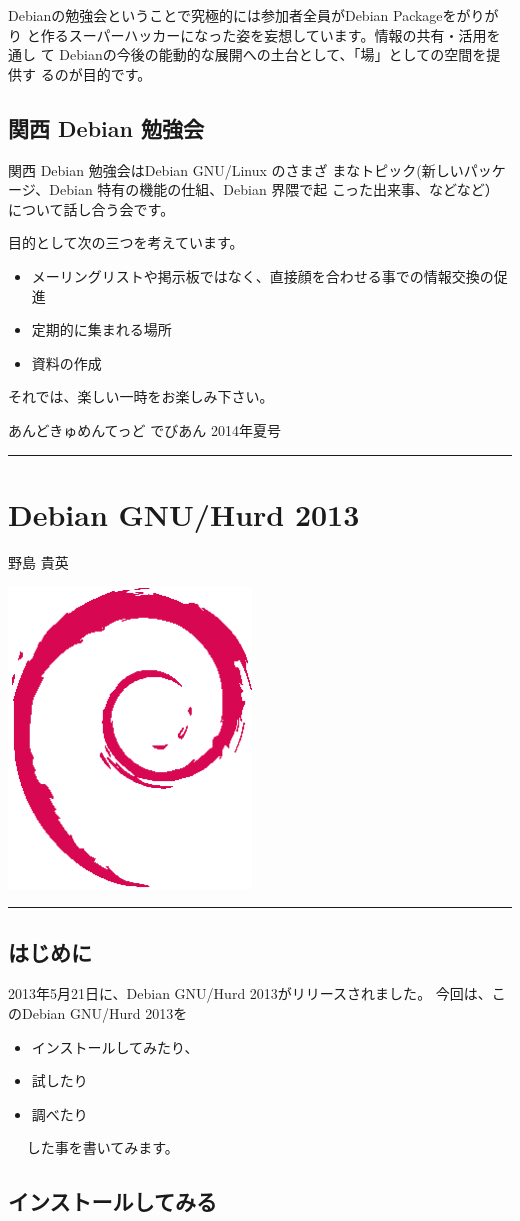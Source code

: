 \documentclass[mingoth,a4paper]{jsarticle}
\renewcommand{\dancersection}[2]{%
\newpage
あんどきゅめんてっど でびあん 2014年夏号
%
\vspace{0.1mm}\\
{\color{dancerdarkblue}\rule{\hsize}{2mm}}

%
%
\begin{minipage}[t]{0.6\hsize}
\color{dancerdarkblue}
\vspace{1cm}
\section{#1}
\hfill{}#2\\
\end{minipage}
\begin{minipage}[t]{0.4\hsize}
\vspace{-2cm}
\hfill{}\includegraphics[height=8cm]{image200502/openlogo-nd.eps}\\
\vspace{-5cm}
\end{minipage}
%
{\color{dancerlightblue}\rule{0.66\hsize}{2mm}}
%
\vspace{2cm}
}
\begin{document}
 Debianの勉強会ということで究極的には参加者全員がDebian Packageをがりがり
 と作るスーパーハッカーになった姿を妄想しています。情報の共有・活用を通し
 て Debianの今後の能動的な展開への土台として、「場」としての空間を提供す
 るのが目的です。

\subsection{関西 Debian 勉強会}

 関西 Debian 勉強会はDebian GNU/Linux のさまざ
 まなトピック(新しいパッケージ、Debian 特有の機能の仕組、Debian 界隈で起
 こった出来事、などなど）について話し合う会です。

 目的として次の三つを考えています。
 \begin{itemize}
  \item メーリングリストや掲示板ではなく、直接顔を合わせる事での情報交換の促進
  \item 定期的に集まれる場所
  \item 資料の作成
 \end{itemize}

 それでは、楽しい一時をお楽しみ下さい。


\clearpage
\newpage
\dancersection{Debian GNU/Hurd 2013}{野島 貴英}

\subsection{はじめに}

 2013年5月21日に、Debian GNU/Hurd 2013がリリースされました\cite{news-release-hurd}。
 今回は、このDebian GNU/Hurd 2013を
\begin{itemize}
\item インストールしてみたり、
\item 試したり
\item 調べたり
\end{itemize}　
した事を書いてみます。

\subsection{インストールしてみる}
\end{document}
